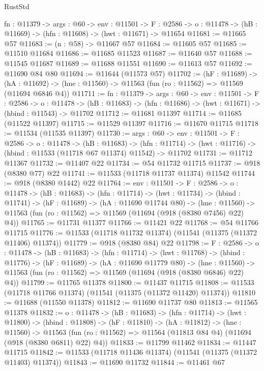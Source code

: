 \begin{lexlean}{RustStd}
\begin{coremodule}
  {fn : @11379} ->
  {args : @60} ->
  {env : @11501} ->
  {F : @2586} -> {o : @11478} -> (hB : @11669) -> (hfn : @11608) -> (hwt : @11671) -> @11654
@11681 := @11665 @57
@11683 := (n : @58) -> @11667 @57
@11684 := @11605 @57
@11685 := @11510 @11684
@11686 := @11685 @11523
@11687 := @11640 @57
@11688 := @11545 @11687
@11689 := @11688 @11551
@11690 := @11613 @57
@11692 := @11690 @84 @80
@11694 := @11644 (@11573 @57)
@11702 := (hF : @11689) ->
  (hA : @11692) -> (hne : @11560) -> @11563 (fun (ro : @11562) => @11569 (@11694 @6846 @4))
@11711 := {fn : @11379} ->
  {args : @60} ->
  {env : @11501} ->
  {F : @2586} ->
  {o : @11478} -> (hB : @11683) -> (hfn : @11686) -> (hwt : @11671) -> (hbind : @11543) -> @11702
@11712 := @11681 @11397
@11714 := @11685 (@11522 @11397)
@11715 := @11529 @11397
@11716 := @11670 @11715
@11718 := @11534 (@11535 @11397)
@11730 := {args : @60} ->
  {env : @11501} ->
  {F : @2586} ->
  {o : @11478} ->
  (hB : @11683) ->
  (hfn : @11714) -> (hwt : @11716) -> (hbind : @11533 (@11718 @67 @11374) @11542) -> @11702
@11731 := @11712 @11367
@11732 := @11407 @22
@11734 := @54 @11732 @11715
@11737 := @918 (@8380 @77) @22
@11741 := @11533 (@11718 @11737 @11374) @11542
@11744 := @918 (@8380 @1442) @22
@11764 := {env : @11501} ->
  {F : @2586} ->
  {o : @11478} ->
  (hB : @11683) ->
  (hfn : @11714) ->
  (hwt : @11734) ->
  (hbind : @11741) ->
  (hF : @11689) ->
  (hA : @11690 @11744 @80) ->
  (hne : @11560) -> @11563 (fun (ro : @11562) => @11569 (@11694 (@918 (@8380 @7456) @22) @4))
@11765 := @11731 @11377
@11766 := @11421 @22
@11768 := @54 @11766 @11715
@11776 := @11533 (@11718 @11732 @11374) (@11541 (@11375 (@11372 @11406) @11374))
@11779 := @918 (@8380 @84) @22
@11798 := {F : @2586} ->
  {o : @11478} ->
  (hB : @11683) ->
  (hfn : @11714) ->
  (hwt : @11768) ->
  (hbind : @11776) ->
  (hF : @11689) ->
  (hA : @11690 @11779 @80) ->
  (hne : @11560) -> @11563 (fun (ro : @11562) => @11569 (@11694 (@918 (@8380 @6846) @22) @4))
@11799 := @11765 @11378
@11800 := @11437 @11715
@11808 := @11533 (@11718 @11766 @11374) (@11541 (@11375 (@11372 @11420) @11374))
@11810 := @11688 (@11550 @11378)
@11812 := @11690 @11737 @80
@11813 := @11565 @11378
@11832 := {o : @11478} ->
  (hB : @11683) ->
  (hfn : @11714) ->
  (hwt : @11800) ->
  (hbind : @11808) ->
  (hF : @11810) ->
  (hA : @11812) ->
  (hne : @11560) ->
  @11563 (fun (ro : @11562) => @11564 (@11813 @84 @4) (@11694 (@918 (@8380 @6811) @22) @4))
@11833 := @11799 @11462
@11834 := @11447 @11715
@11842 := @11533 (@11718 @11436 @11374) (@11541 (@11375 (@11372 @11403) @11374))
@11843 := @11690 @11732
@11844 := @11461 @67

\end{coremodule}
\end{lexlean}
